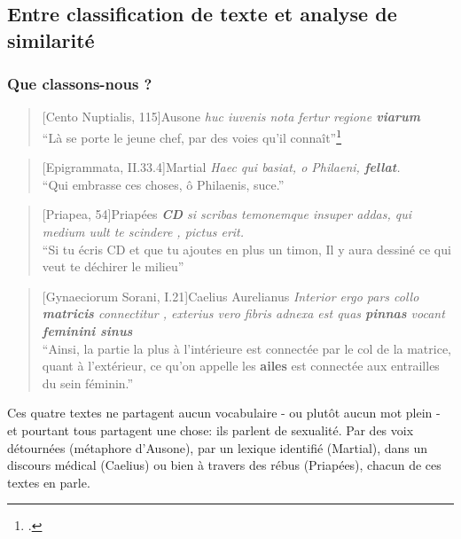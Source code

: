 \subsection{Entre classification de texte et analyse de similarité}

\subsubsection{Que classons-nous ?}

\begin{quote}[Cento Nuptialis, 115]{Ausone}
    \textit{huc iuvenis nota fertur regione \textbf{viarum}} \\
    \enquote{Là se porte le jeune chef, par des voies qu'il connaît}\footcite{Traduction de Bernard Combeaud}
\end{quote}

\begin{quote}[Epigrammata, II.33.4]{Martial}
    \textit{Haec qui basiat, o Philaeni, \textbf{fellat}. \\}
    \enquote{Qui embrasse ces choses, ô Philaenis, suce.}
\end{quote}

\begin{quote}[Priapea, 54]{Priapées}
    \textit{\textbf{CD} si scribas temonemque insuper addas, qui medium uult te scindere , pictus erit.} \\
    \enquote{Si tu écris CD et que tu ajoutes en plus un timon, Il y aura dessiné ce qui veut te déchirer le milieu}
\end{quote}

\begin{quote}[Gynaeciorum Sorani, I.21]{Caelius Aurelianus}
    \textit{Interior ergo pars collo \textbf{matricis} connectitur , exterius vero fibris adnexa est quas \textbf{pinnas} vocant \textbf{feminini sinus}} \\
    \enquote{Ainsi, la partie la plus à l'intérieure est connectée par le col de la matrice, quant à l'extérieur, ce qu'on appelle les \textbf{ailes} est connectée aux entrailles du sein féminin.}
\end{quote}

Ces quatre textes ne partagent aucun vocabulaire - ou plutôt aucun mot plein - et pourtant tous partagent une chose: ils parlent de sexualité. Par des voix détournées (métaphore d'Ausone), par un lexique identifié (Martial), dans un discours médical (Caelius) ou bien à travers des rébus (Priapées), chacun de ces textes en parle.

